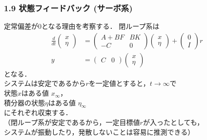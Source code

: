 \begin{frame}[t]
\frametitle{1.9 状態フィードバック (サーボ系)}
定常偏差が$0$となる理由を考察する．
閉ループ系は
\begin{align}
 \frac{d}{dt}
  \left(\begin{array}{c}
         x \\
   \eta
  \end{array}\right)
  &=
  \left(\begin{array}{cc}
         A + B F & B K \\
   - C     & 0
  \end{array}\right)
  \left(\begin{array}{c}
         x \\
   \eta
  \end{array}\right)
  +
  \left(\begin{array}{c}
         0 \\
   I
  \end{array}\right)
  r \\
 y &=
  \left(\begin{array}{cc}
         C & 0
  \end{array}\right)
  \left(\begin{array}{c}
         x \\
   \eta
  \end{array}\right)
\end{align}
となる．\\
システムは安定であるから$r$を一定値とすると，$t \rightarrow \infty$で\\
\hspace*{1cm} 状態$x$はある値 $x_{\infty}$，\\
\hspace*{1cm} 積分器の状態$\eta$はある値 $\eta_{\infty}$\\
にそれぞれ収束する．\\
（閉ループ系が安定であるから，一定目標値$r$が入ったとしても，\\
システムが振動したり，発散しないことは容易に推測できる）
\end{frame}


